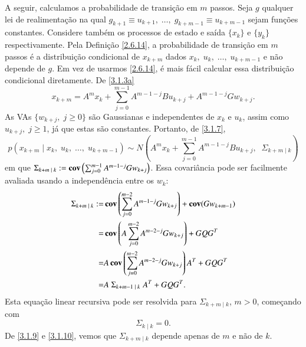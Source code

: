 A seguir, calculamos a probabilidade de transição em $m$ passos. Seja $g$ qualquer lei de realimentação na qual
$g_{k+1}\equiv u_{k+1},\;\dots,\; g_{k+m-1}\equiv u_{k+m-1}$ sejam funções constantes. Considere também os processos de estado e saída $\{x_k\}$ e $\{y_k\}$ respectivamente. Pela Definição \ref{2.6.14}, a probabilidade de transição em $m$ passos é a distribuição condicional de $x_{k+m}$ dados $x_k,\;u_k,\;\dots,\;u_{k+m-1}$ e não depende de $g$. Em vez de usarmos  \eqref{2.6.14}, é mais fácil calcular essa distribuição condicional diretamente. De \eqref{3.1.3a}
\begin{equation}\label{3.1.7}
	x_{k+m}=A^mx_k+\sum_{j=0}^{m-1}
	A^{m-1-j}Bu_{k+j}+
	A^{m-1-j}Gw_{k+j}.
\end{equation}
As VAs $\{w_{k+j},\;j\ge0\}$ são Gaussianas e independentes de $x_k$ e $u_k$, assim como $u_{k+j},\;j\ge1$, já que estas são constantes. Portanto, de \eqref{3.1.7},
\begin{equation}\label{3.1.8}
	p(x_{k+m}\;|\;x_k,\;u_k,\;\dots,\;u_{k+m-1})
	\sim N\left(A^mx_k+\sum_{j=0}^{m-1}
	A^{m-1-j}Bu_{k+j},\;\;
	\Sigma_{k+m\;|\;k}\right)
\end{equation}
em que $\Sigma_{k+m\;|\;k}:=\operatorname{\bf cov}\left(\sum_{j=0}^{m-1}A^{m-1-j}Gw_{k+j}\right)$. Essa covariância pode ser facilmente avaliada usando a independência entre os $w_k$:
\begin{equation}\label{3.1.9}
\begin{aligned}
	\Sigma_{k+m\;|\;k}:=&
	\operatorname{\bf cov}\left(\sum_{j=0}^{m-2}A^{m-1-j}
	Gw_{k+j}\right)+\operatorname{\bf cov}(Gw_{k+m-1})\\
	=&\operatorname{\bf cov}\left(A\sum_{j=0}^{m-2}A^{m-2-j}
	Gw_{k+j}\right)+GQG^T\\
	=&A\operatorname{\bf cov}\left(\sum_{j=0}^{m-2}A^{m-2-j}
	Gw_{k+j}\right)A^T+GQG^T\\
	=& A\;\Sigma_{k+m-1\;|\;k}\;A^T+GQG^T.
\end{aligned}
\end{equation}
Esta equação linear recursiva pode ser resolvida para $\Sigma_{k+m\;|\;k}$, $m>0$, começando com
\begin{equation}\label{3.1.10}
\Sigma_{k\;|\;k}=0.
\end{equation}
De \eqref{3.1.9} e \eqref{3.1.10}, vemos que $\Sigma_{k+m\;|\;k}$ depende apenas de $m$ e não de $k$.

